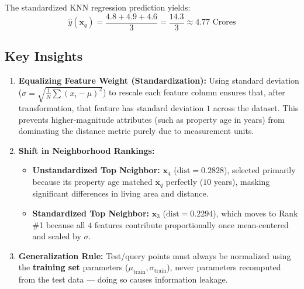 \documentclass[12pt]{article}
\newcommand{\MVec}[1]{\mathbf{#1}}
\begin{document}
The standardized KNN regression prediction yields:
\[
    \hat{y}(\MVec{x}_q) = \frac{4.8 + 4.9 + 4.6}{3} = \frac{14.3}{3} \approx 4.77 \text{ Crores}
\]

\subsection*{Key Insights}

\begin{tcolorbox}[colback=blue!5!white,colframe=blue!75!black,title=Why Feature Scaling Matters]
\begin{enumerate}
    \item \textbf{Equalizing Feature Weight (Standardization):} Using standard deviation ($\sigma = \sqrt{\frac{1}{N}\sum(x_i - \mu)^2}$) to rescale each feature column ensures that, after transformation, that feature has standard deviation $1$ across the dataset. This prevents higher-magnitude attributes (such as property age in years) from dominating the distance metric purely due to measurement units.
    \item \textbf{Shift in Neighborhood Rankings:}
          \begin{itemize}
              \item \textbf{Unstandardized Top Neighbor:} $\MVec{x}_4$ ($\text{dist} = 0.2828$), selected primarily because its property age matched $\MVec{x}_q$ perfectly ($10$ years), masking significant differences in living area and distance.
              \item \textbf{Standardized Top Neighbor:} $\MVec{x}_3$ ($\text{dist} = 0.2294$), which moves to Rank \#1 because all $4$ features contribute proportionally once mean-centered and scaled by $\sigma$.
          \end{itemize}
    \item \textbf{Generalization Rule:} Test/query points must always be normalized using the \textbf{training set} parameters ($\mu_{\text{train}}, \sigma_{\text{train}}$), never parameters recomputed from the test data — doing so causes information leakage.
\end{enumerate}
\end{tcolorbox}
\end{document}
